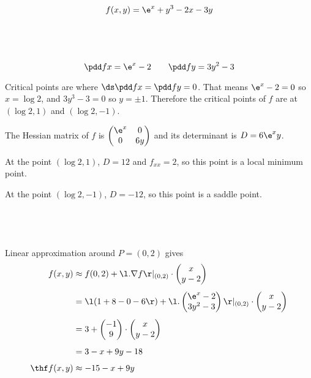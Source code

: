 \documentclass[a4paper]{article}
\begin{document}
$$f(x, y) = \e^x + y^3 - 2x - 3y$$

\subsection{~}

$$\pdd fx = \e^x - 2 \qquad \pdd fy = 3y^2 - 3$$

Critical points are where $\ds \pdd fx = \pdd fy = 0$. That means $\e^x - 2 = 0$ so $x = \log 2$, and $3y^3 - 3 = 0$ so $y = \pm 1$. Therefore the critical points of $f$ are at $(\log 2, 1)$ and $(\log 2, -1)$.

The Hessian matrix of $f$ is $\begin{pmatrix} \e^x & 0\\ 0 & 6y \end{pmatrix}$ and its determinant is $D = 6 \e^x y$.

At the point $(\log 2, 1)$, $D = 12$ and $f_{xx} = 2$, so this point is a local minimum point.

At the point $(\log 2, -1)$, $D = -12$, so this point is a saddle point.

\subsection{~}

Linear approximation around $P = (0, 2)$ gives \begin{align*}
f(x, y) &\approx f(0, 2) + \l. \nabla f \r|_{(0,2)} \cdot \begin{pmatrix}x\\ y-2\end{pmatrix}\\[1ex]
&= \l( 1 + 8 - 0 - 6 \r) + \l. \begin{pmatrix}\e^x - 2\\ 3y^2 - 3\end{pmatrix} \r|_{(0,2)} \cdot \begin{pmatrix}x\\ y-2\end{pmatrix}\\[1ex]
&= 3 + \begin{pmatrix}-1\\ 9\end{pmatrix} \cdot \begin{pmatrix}x\\ y-2\end{pmatrix}\\[1ex]
&= 3 -x + 9y - 18\\[1ex]
\thf f(x, y) &\approx -15 -x + 9y
\end{align*}
\end{document}

